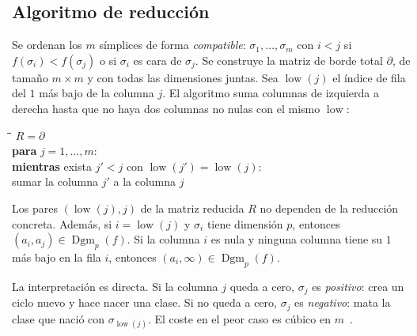 \subsection{Algoritmo de reducción}

Se ordenan los $m$ símplices de forma
\emph{compatible}: $\sigma_1,\dots,\sigma_m$ con $i<j$ si
$f(\sigma_i)<f(\sigma_j)$ o si $\sigma_i$ es cara de $\sigma_j$. Se
construye la matriz de borde total $\partial$, de tamaño $m\times m$ y con
todas las dimensiones juntas. Sea $\operatorname{low}(j)$ el índice de fila
del $1$ más bajo de la columna $j$. El algoritmo suma columnas de izquierda
a derecha hasta que no haya dos columnas no nulas con el mismo
$\operatorname{low}$:

\begin{center}
\begin{minipage}{0.7\textwidth}
\begin{tabbing}
\quad\=\quad\=\quad\=\kill
$R=\partial$\\
\textbf{para} $j=1,\dots,m$:\\
\>\textbf{mientras} exista $j'<j$ con $\operatorname{low}(j')=\operatorname{low}(j)$:\\
\>\>sumar la columna $j'$ a la columna $j$
\end{tabbing}
\end{minipage}
\end{center}

\begin{teorema}
Los pares $(\operatorname{low}(j),j)$ de la matriz reducida $R$ no dependen
de la reducción concreta. Además, si $i=\operatorname{low}(j)$ y $\sigma_i$
tiene dimensión $p$, entonces $(a_i,a_j)\in\operatorname{Dgm}_p(f)$. Si la
columna $i$ es nula y ninguna columna tiene su $1$ más bajo en la fila $i$,
entonces $(a_i,\infty)\in\operatorname{Dgm}_p(f)$.
\end{teorema}

La interpretación es directa. Si la columna $j$ queda a cero, $\sigma_j$ es
\emph{positivo}: crea un ciclo nuevo y hace nacer una clase. Si no queda a
cero, $\sigma_j$ es \emph{negativo}: mata la clase que nació con
$\sigma_{\operatorname{low}(j)}$. El coste en el peor caso es cúbico en
$m$~\cite[§VII.1]{edelsbrunner2010}.


